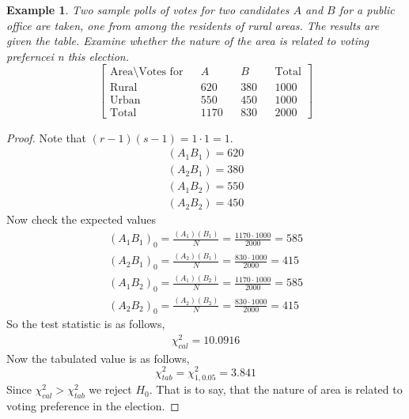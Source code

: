 \documentclass[oneside,11pt,pdftex]{book}%
\numberwithin{equation}{section}
\newtheorem{example}[theorem]{Example}
\numberwithin{section}{chapter}
\numberwithin{equation}{chapter}
\begin{document}
\begin{example}
	Two sample polls of votes for two candidates $ A $ and $ B $ for a public office are taken, one from among the residents of rural areas. The results are given the table. Examine whether the nature of the area is related to voting preferncei n this election.
	\[ \begin{bmatrix}
		\text{Area} \setminus \text{Votes for} && A && B && \text{Total}\\
		\text{Rural} && 620 && 380 && 1000\\
		\text{Urban} && 550 && 450 && 1000\\
		\text{Total} && 1170 && 830 && 2000
	\end{bmatrix} \]
\end{example}
\begin{proof}
	Note that $ (r-1)(s-1)=1\cdot1=1 $.
	\begin{align*}
		(A_1B_1)=620\\
		(A_2B_1)=380\\
		(A_1B_2)=550\\
		(A_2B_2)=450
	\end{align*}
	Now check the expected values
	\begin{align*}
		(A_1B_1)_0=\frac{(A_1)(B_1)}{N}=\frac{1170 \cdot 1000}{2000}=585\\
		(A_2B_1)_0=\frac{(A_2)(B_1)}{N}=\frac{830 \cdot 1000}{2000}=415\\
		(A_1B_2)_0=\frac{(A_1)(B_2)}{N}=\frac{1170 \cdot 1000}{2000}=585\\
		(A_2B_2)_0=\frac{(A_2)(B_2)}{N}=\frac{830 \cdot 1000}{2000}=415
	\end{align*}
	So the test statistic is as follows,
	\begin{align*}
		\chi^2_{cal}=10.0916
	\end{align*}
Now the tabulated value is as follows,
\[ 		\chi^2_{tab}=\chi^2_{1,0.05}=3.841 \]
Since $ \chi^2_{cal}>\chi^2_{tab} $ we reject $ H_0 $. That is to say, that the nature of area is related to voting preference in the election.
\end{proof}
\end{document}
